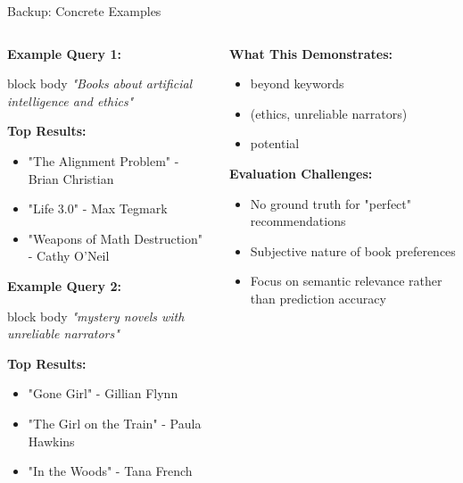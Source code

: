 \begin{frame}{Backup: Concrete Examples}

\begin{columns}[T]
  \begin{column}{0.50\textwidth}
    \textbf{Example Query 1:}
    \begin{beamercolorbox}[sep=4pt,left]{block body}
     \textit{"Books about artificial intelligence and ethics"}
    \end{beamercolorbox}
    
    \textbf{Top Results:}
    \begin{itemize}
      \item  "The Alignment Problem" - Brian Christian
      \item  "Life 3.0" - Max Tegmark  
      \item  "Weapons of Math Destruction" - Cathy O'Neil
    \end{itemize}

    \vspace{0.1cm}
    \textbf{Example Query 2:}
    \begin{beamercolorbox}[sep=4pt,left]{block body}
     \textit{"mystery novels with unreliable narrators"}
    \end{beamercolorbox}
    
    \textbf{Top Results:}
    \begin{itemize}
      \item  "Gone Girl" - Gillian Flynn
      \item  "The Girl on the Train" - Paula Hawkins
      \item  "In the Woods" - Tana French
    \end{itemize}
  \end{column}

  \begin{column}{0.45\textwidth}
    \textbf{What This Demonstrates:}
    \begin{itemize}
      \item  {} beyond keywords
      \item  {} (ethics, unreliable narrators)
      \item  {} potential
    \end{itemize}

    \vspace{0.1cm}
    \textbf{Evaluation Challenges:}
    \begin{itemize}
      \item  No ground truth for "perfect" recommendations
      \item  Subjective nature of book preferences
      \item  {} Focus on semantic relevance rather than prediction accuracy
    \end{itemize}


\end{column}
\end{columns}
\end{frame}

